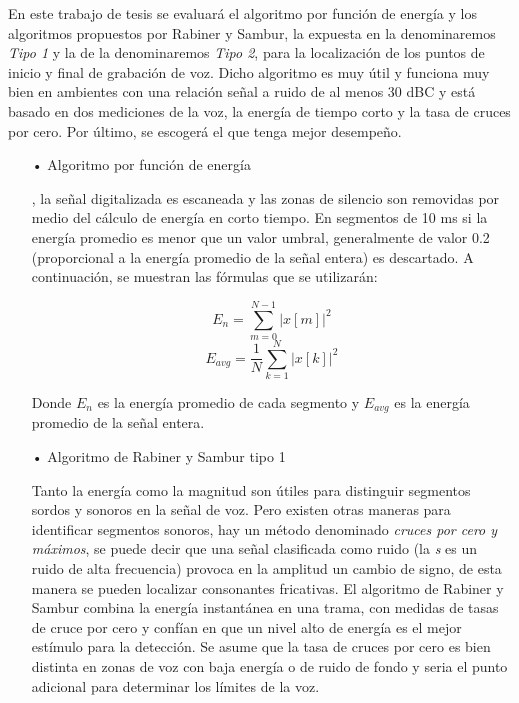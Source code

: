\begin{enumerate}
En este trabajo de tesis se evaluará el algoritmo por función de energía y los algoritmos propuestos por Rabiner y Sambur, la expuesta en \cite{unam} la denominaremos \textit{Tipo 1} y la de \cite{rabiner} la denominaremos \textit{Tipo 2}, para la localización de los puntos de inicio y final de grabación de voz. Dicho algoritmo es muy útil y funciona muy bien en ambientes con una relación señal a ruido de al menos 30 dBC y está basado en dos mediciones de la voz, la energía de tiempo corto y la tasa de cruces por cero. Por último, se escogerá el que tenga mejor desempeño.

\begin{enumerate}
\item[•]Algoritmo por función de energía
\par
\cite{genoveva}, la señal digitalizada es escaneada y las zonas de silencio son removidas por medio del cálculo de energía en corto tiempo. En segmentos de 10 ms si la energía promedio es menor que un valor umbral, generalmente de valor 0.2 (proporcional a la energía promedio de la señal entera) es descartado. A continuación, se muestran las fórmulas que se utilizarán:

\begin{equation}
\label{eq:ecuacion17}
E_{n} = \sum_{m=0}^{N-1}\left | x[m] \right |^{2}
\end{equation}
\vskip -0.5cm
\begin{equation}
\label{eq:ecuacion18}
E_{avg} = \frac{1}{N}\sum_{k=1}^{N}\left | x[k] \right |^{2}
\end{equation}

Donde $E_{n}$ es la energía promedio de cada segmento y $E_{avg}$ es la energía promedio de la señal entera.

\item[•]Algoritmo de Rabiner y Sambur tipo 1
\par
Tanto la energía como la magnitud son útiles para distinguir segmentos sordos y sonoros en la señal de voz. Pero existen otras maneras para identificar segmentos sonoros, hay un método denominado \textit{cruces por cero y máximos}, se puede decir que una señal clasificada como ruido (la \textit{s} es un ruido de alta frecuencia) provoca en la amplitud un cambio de signo, de esta manera se pueden localizar consonantes fricativas.
\vskip 0.5cm
El algoritmo de Rabiner y Sambur combina la energía instantánea en una trama, con medidas de tasas de cruce por cero y confían en que un nivel alto de energía es el mejor estímulo para la detección. Se asume que la tasa de cruces por cero es bien distinta en zonas de voz con baja energía o de ruido de fondo y seria el punto adicional para determinar los límites de la voz.


\end{enumerate}
\end{enumerate}
